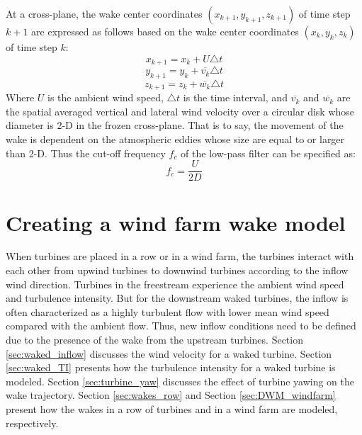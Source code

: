 \documentclass{umthesis}
\begin{document}
At a cross-plane, the wake center coordinates $(x_{k+1},y_{k+1},z_{k+1})$ of time step $k+1$ are expressed as follows based on the wake center coordinates $(x_{k},y_{k},z_{k})$ of time step $k$:
\begin{equation}
  x_{k+1}=x_k+U\triangle t
\end{equation}
\begin{equation}
  y_{k+1}=y_k+\overline{v_k}\triangle t
\end{equation}
\begin{equation}
  z_{k+1}=z_k+\overline{w_k}\triangle t
\end{equation}
Where $U$ is the ambient wind speed, $\triangle t$ is the time interval, and $\overline{v_k}$ and $\overline{w_k}$ are the spatial averaged vertical and lateral wind velocity over a circular disk whose diameter is 2-D in the frozen cross-plane. That is to say, the movement of the wake is dependent on the atmospheric eddies whose size are equal to or larger than 2-D. Thus the cut-off frequency $f_c$ of the low-pass filter can be specified as:
\begin{equation}
  f_c=\frac{U}{2D}
\end{equation}



\chapter{Creating a wind farm wake model}
When turbines are placed in a row or in a wind farm, the turbines interact with each other from upwind turbines to downwind turbines according to the inflow wind direction. Turbines in the freestream experience the ambient wind speed and turbulence intensity. But for the downstream waked turbines, the inflow is often characterized as a highly turbulent flow with lower mean wind speed compared with the ambient flow. Thus, new inflow conditions need to be defined due to the presence of the wake from the upstream turbines. Section \ref{sec:waked_inflow} discusses the wind velocity for a waked turbine. Section \ref{sec:waked_TI} presents how the turbulence intensity for a waked turbine is modeled. Section \ref{sec:turbine_yaw} discusses the effect of turbine yawing on the wake trajectory. Section \ref{sec:wakes_row} and Section \ref{sec:DWM_windfarm} present how the wakes in a row of turbines and in a wind farm are modeled, respectively.
\end{document}
